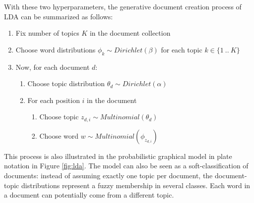 \documentclass[
        a4paper,
        titlepage,
        twoside,
        parskip,
        numbers=noenddot
        ]{scrbook}
\theoremstyle{break}
\begin{document}
With these two hyperparameters, the generative document creation process of LDA can be summarized as follows:
\begin{enumerate}
       \item Fix number of topics $K$ in the document collection
       \item Choose word distributions $\phi_k \sim Dirichlet(\beta)$ for each topic $k \in \{1~..~K\}$
       \item Now, for each document $d$:
       \begin{enumerate}
              \item Choose topic distribution $\theta_d \sim Dirichlet(\alpha)$
              \item For each position $i$ in the document
              \begin{enumerate}
                     \item Choose topic $z_{d,i} \sim Multinomial(\theta_d)$
                     \item Choose word $w \sim Multinomial(\phi_{z_{d,i}})$
              \end{enumerate}
       \end{enumerate}
\end{enumerate}
This process is also illustrated in the probabilistic graphical model in plate notation in Figure \ref{fig:lda}.
The model can also be seen as a soft-classification of documents: instead of assuming exactly one topic per document, the document-topic distributions represent a fuzzy membership in several classes.
Each word in a document can potentially come from a different topic.
\end{document}

